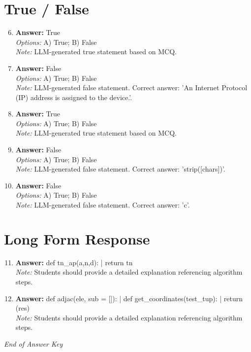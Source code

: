 \documentclass[12pt]{article}
\begin{document}
\section*{True / False}
\begin{enumerate}[label=\arabic*.]
\setcounter{enumi}{5}
\item \textbf{Answer:} True
\\ \textit{Options:} A) True; B) False
\\ \textit{Note:} LLM-generated true statement based on MCQ.
\item \textbf{Answer:} False
\\ \textit{Options:} A) True; B) False
\\ \textit{Note:} LLM-generated false statement. Correct answer: 'An Internet Protocol (IP) address is assigned to the device.'.
\item \textbf{Answer:} True
\\ \textit{Options:} A) True; B) False
\\ \textit{Note:} LLM-generated true statement based on MCQ.
\item \textbf{Answer:} False
\\ \textit{Options:} A) True; B) False
\\ \textit{Note:} LLM-generated false statement. Correct answer: 'strip([chars])'.
\item \textbf{Answer:} False
\\ \textit{Options:} A) True; B) False
\\ \textit{Note:} LLM-generated false statement. Correct answer: 'c'.
\end{enumerate}

\section*{Long Form Response}
\begin{enumerate}[label=\arabic*.]
\setcounter{enumi}{10}
\item \textbf{Answer:} def tn\_ap(a,n,d): | return tn
\\ \textit{Note:} Students should provide a detailed explanation referencing algorithm steps.
\item \textbf{Answer:} def adjac(ele, sub = []): | def get\_coordinates(test\_tup): | return (res)
\\ \textit{Note:} Students should provide a detailed explanation referencing algorithm steps.
\end{enumerate}

\vfill
\noindent\textit{End of Answer Key}
\end{document}
